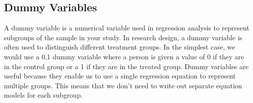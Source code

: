 \subsection{Dummy Variables}
A dummy variable is a numerical variable used in regression analysis to represent subgroups of the sample in your study. In research design, a dummy variable is often used to distinguish different treatment groups. In the simplest case, we would use a 0,1 dummy variable where a person is given a value of 0 if they are in the control group or a 1 if they are in the treated group. Dummy variables are useful because they enable us to use a single regression equation to represent multiple groups. This means that we don't need to write out separate equation models for each subgroup.

